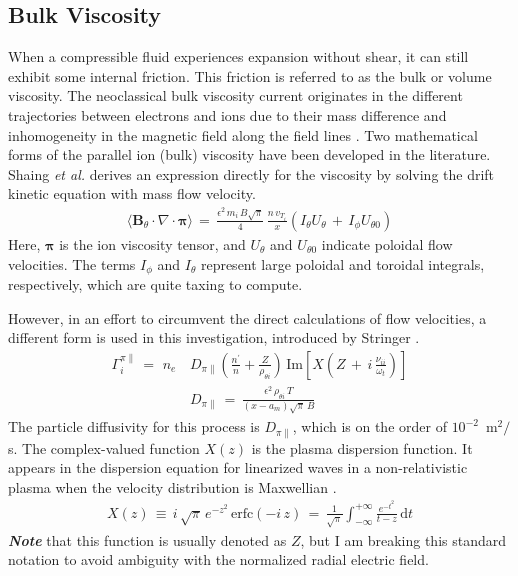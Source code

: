 \subsection{Bulk Viscosity}\label{ssec:bulk_viscosity}
When a compressible fluid experiences expansion without shear, it can still exhibit some internal friction.
This friction is referred to as the bulk or volume viscosity.
The neoclassical bulk viscosity current originates in the different trajectories between electrons and ions due to their mass difference and inhomogeneity in the magnetic field along the field lines \cite{kobayashi_model_2017}.
Two mathematical forms of the parallel ion (bulk) viscosity have been developed in the literature.
Shaing \emph{et al.} \cite{shaing_bifurcation_1990} derives an expression directly for the viscosity by solving the drift kinetic equation with mass flow velocity.
\begin{align}%
	\langle \mathbf{B}_\theta \cdot \nabla \cdot \boldsymbol{\pi} \rangle \,=\,
		\frac{\epsilon^2 \, m_i \, B \sqrt{\pi}}{4} \, \frac{n\,v_{T_i}}{x}
		\left(I_\theta U_\theta \,+\, I_\phi U_{\theta 0}\right)
		\label{eq:shaing_bulk}
\end{align}
Here, $\boldsymbol{\pi}$ is the ion viscosity tensor, and $U_\theta$ and $U_{\theta 0}$ indicate poloidal flow velocities.
The terms $I_\phi$ and $I_\theta$ represent large poloidal and toroidal integrals, respectively, which are quite taxing to compute.

However, in an effort to circumvent the direct calculations of flow velocities, a different form is used in this investigation, introduced by Stringer \cite{stringer_explanation_1993}.
\begin{align} %
	\Gamma_i^{\pi\parallel} \,=\, \,n_e\,&D_{\pi\parallel}
		\left(\frac{n^\prime}{n} + \frac{Z}{\rho_{\theta i}}\right) \,
		\text{Im}\left[X\left(Z \,+\, i\,\frac{\nu_{ii}}{\omega_t}\right)\right]
		\label{eq:stringer_Gamma_bulk} \\
	&D_{\pi\parallel} \,=\, \frac{\epsilon^2\,\rho_{\theta i}\,T}
		{(x - a_m)\sqrt{\pi}\,B} \label{eq:stringer_D_bulk}
\end{align}
The particle diffusivity for this process is $D_{\pi\parallel}$, which is on the order of $10^{-2}$~m$^2 / $s.
The complex-valued function $X(z)$ is the plasma dispersion function.
It appears in the dispersion equation for linearized waves in a non-relativistic plasma when the velocity distribution is Maxwellian \cite{fried_plasma_2015}.
\begin{align} %
	X(z) \,\equiv\, i\,\sqrt{\pi} \, e^{-z^2} \, \text{erfc}(-i\,z) \,=\,
		\frac{1}{\sqrt{\pi}} \int_{-\infty}^{+\infty} \frac{e^{-t^2}}{t - z}
		\, \text{d}t \label{eq:plasma_disp}
\end{align}
\emph{\textbf{Note}} that this function is usually denoted as $Z$, but I am breaking this standard notation to avoid ambiguity with the normalized radial electric field.

